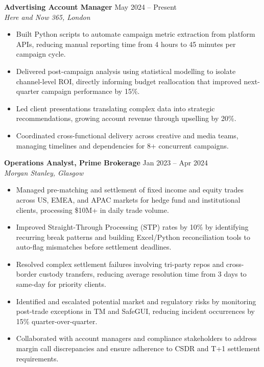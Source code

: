 \documentclass[11pt,a4paper]{article}
\begin{document}
\textbf{Advertising Account Manager} \hfill May 2024 -- Present \\
\textit{Here and Now 365, London}
\begin{itemize}
    \item Built Python scripts to automate campaign metric extraction from platform APIs, reducing manual reporting time from 4 hours to 45 minutes per campaign cycle.
    \item Delivered post-campaign analysis using statistical modelling to isolate channel-level ROI, directly informing budget reallocation that improved next-quarter campaign performance by 15\%.
    \item Led client presentations translating complex data into strategic recommendations, growing account revenue through upselling by 20\%.
    \item Coordinated cross-functional delivery across creative and media teams, managing timelines and dependencies for 8+ concurrent campaigns.
\end{itemize}

\textbf{Operations Analyst, Prime Brokerage} \hfill Jan 2023 -- Apr 2024 \\
\textit{Morgan Stanley, Glasgow}
\begin{itemize}
    \item Managed pre-matching and settlement of fixed income and equity trades across US, EMEA, and APAC markets for hedge fund and institutional clients, processing \$10M+ in daily trade volume.
    \item Improved Straight-Through Processing (STP) rates by 10\% by identifying recurring break patterns and building Excel/Python reconciliation tools to auto-flag mismatches before settlement deadlines.
    \item Resolved complex settlement failures involving tri-party repos and cross-border custody transfers, reducing average resolution time from 3 days to same-day for priority clients.
    \item Identified and escalated potential market and regulatory risks by monitoring post-trade exceptions in TM and SafeGUI, reducing incident occurrences by 15\% quarter-over-quarter.
    \item Collaborated with account managers and compliance stakeholders to address margin call discrepancies and ensure adherence to CSDR and T+1 settlement requirements.
\end{itemize}
\end{document}
